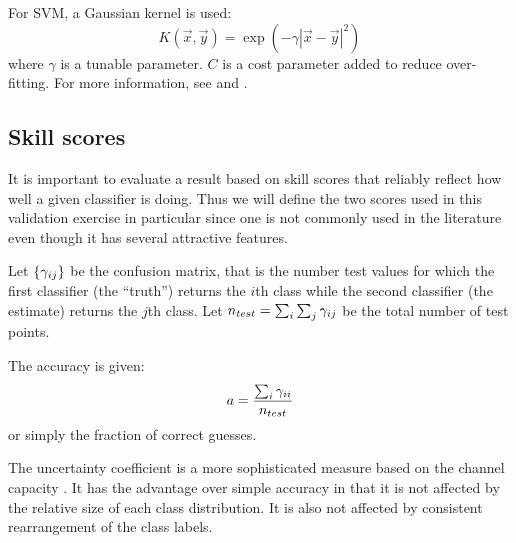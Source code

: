 \documentclass[11pt]{article}
\begin{document}
For SVM, a Gaussian kernel is used:
\begin{equation}
	K(\vec x, \vec y) = \exp \left ( -\gamma | \vec x - \vec y |^2 \right )
\end{equation}
where $\gamma$ is a tunable parameter. 
$C$ is a cost parameter added to reduce over-fitting.
For more information, see \citet{Chang_Lin2011} and \citet{kernel_intro}.

\subsection{Skill scores}

It is important to evaluate a result based on skill scores that reliably reflect
how well a given classifier is doing.
Thus we will define the two scores used in this validation exercise in particular
since one is not commonly used in the literature even though it has several
attractive features.

Let $\lbrace \gamma_{ij} \rbrace$ be the confusion matrix, that is the number
test values for which the first classifier (the ``truth'') returns the $i$th class
while the second classifier (the estimate) returns the $j$th class.
Let $n_{test}=\sum_i \sum_j \gamma_{ij}$ be the total number of test points.

The accuracy is given:
\begin{equation}
a=\frac{\sum_i \gamma_{ii}}{n_{test}}
\label{accuracy}
\end{equation}
or simply the fraction of correct guesses.

The uncertainty coefficient is a more sophisticated measure based on the channel 
capacity \citep{Shannon}. It has the advantage over simple accuracy in that 
it is not affected by the relative size of each class distribution.
It is also not affected by consistent rearrangement of the class labels.
\end{document}
